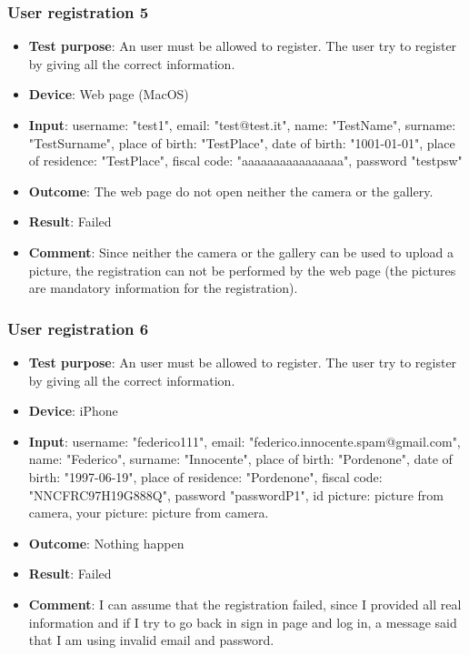 \documentclass[../ATD.tex]{subfiles}
\begin{document}
    \subsubsection{User registration 5}\label{subsubsec:user-registration-5}
    \begin{itemize}
        \item \textbf{Test purpose}: An user must be allowed to register.
        The user try to register by giving all the correct information.
        \item \textbf{Device}: Web page (MacOS)
        \item \textbf{Input}: username: "test1", email: "test@test.it", name: "TestName", surname: "TestSurname", place of birth: "TestPlace", date of birth: "1001-01-01", place of residence: "TestPlace", fiscal code: "aaaaaaaaaaaaaaaa", password "testpsw"
        \item \textbf{Outcome}: The web page do not open neither the camera or the gallery.
        \item \textbf{Result}: Failed
        \item \textbf{Comment}: Since neither the camera or the gallery can be used to upload a picture, the registration can not be performed by the web page (the pictures are mandatory information for the registration).
    \end{itemize}

    \subsubsection{User registration 6}\label{subsubsec:user-registration-6}
    \begin{itemize}
        \item \textbf{Test purpose}: An user must be allowed to register.
        The user try to register by giving all the correct information.
        \item \textbf{Device}: iPhone
        \item \textbf{Input}: username: "federico111", email: "federico.innocente.spam@gmail.com", name: "Federico", surname: "Innocente", place of birth: "Pordenone", date of birth: "1997-06-19", place of residence: "Pordenone", fiscal code: "NNCFRC97H19G888Q", password "passwordP1", id picture: picture from camera, your picture: picture from camera.
        \item \textbf{Outcome}: Nothing happen
        \item \textbf{Result}: Failed
        \item \textbf{Comment}: I can assume that the registration failed, since I provided all real information and if I try to go back in sign in page and log in, a message said that I am using invalid email and password.
    \end{itemize}
\end{document}
